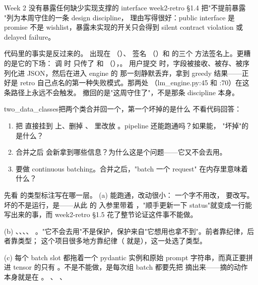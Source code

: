 \begin{retraction}{Week 2 没有暴露任何缺少实现支撑的 interface}
week2-retro §1.4 把"不提前暴露 "列为本周守住的一条 design discipline，
理由写得很好：public interface 是 promise 不是 wishlist，暴露未实现的开关只会得到 silent
contract violation 或 delayed failure。

代码里的事实是反过来的。 出现在 
（）、 签名
（）和  的三个
方法签名上。更糟的是它的下场： 调  时
只传了  和 
（），。
用户提交  时，字段被接收、被存、被序列化进 JSON，然后在进入 engine 的
那一刻静默丢弃，拿到 greedy 结果——正好是 retro 自己点名的第一种失败模式。那两处
（lm\_engine.py:45 和 :70）在这条路径上永远不会触发。
撤回的是"这周守住了"，不是那条 discipline 本身。
\end{retraction}

\begin{checkpoint}{two_data_classes}{把两个类合并回一个，第一个坏掉的是什么}
不看代码回答：
\begin{enumerate}[label=(\alph*)]
  \item 把  直接挂到  上、删掉 、
         里改放 。pipeline 还能跑通吗？如果能，
        "坏掉"的是什么？
  \item 合并之后  会新拿到哪些信息？为什么这是个问题——它又不会去用。
  \item {} 要做 continuous batching。合并之后，"batch 一个 request"
        在内存里意味着什么？
\end{enumerate}
\hint 先看  的类型标注写在哪一层。
\ifshowanswers
\tcblower
\answer (a) 能跑通，改动很小： 一个字不用改，
 要改写。坏的不是运行，是——从此  的
入参里带着 ，"顺手更新一下 status"就变成一行能写出来的事，而 week2-retro §1.5
花了整节论证这件事不能做。

(b) 、、、、
。"它不会去用"不是保护，保护来自"它想用也拿不到"。前者靠纪律，后者靠类型；
这个项目很多地方靠纪律（ 就是），这一处选了类型。

(c) 每个 batch slot 都拖着一个 pydantic 实例和原始 prompt 字符串，而真正要拼进 tensor 的只有
。不是不能做，是每次组 batch 都要先把  摘出来——摘的动作本身就是在
。
\whereincode {}、
、
\fi
\end{checkpoint}

